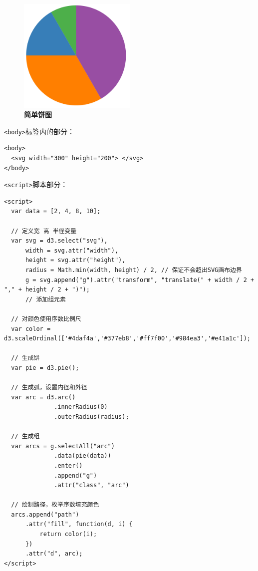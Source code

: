 \begin{figure}[htbp]
    \centering
    \includegraphics[width=0.5\textwidth]{figure/D3/simple_pie.png}
    \caption{\textbf{简单饼图}}
    \label{fig:simple_pie}
\end{figure}

\verb|<body>|标签内的部分：

\begin{verbatim}
<body>
  <svg width="300" height="200"> </svg>
</body>
\end{verbatim}

\verb|<script>|脚本部分：

\begin{verbatim}
<script>
  var data = [2, 4, 8, 10];

  // 定义宽 高 半径变量
  var svg = d3.select("svg"),
      width = svg.attr("width"),
      height = svg.attr("height"),
      radius = Math.min(width, height) / 2, // 保证不会超出SVG画布边界
      g = svg.append("g").attr("transform", "translate(" + width / 2 + "," + height / 2 + ")");
      // 添加组元素
  
  // 对颜色使用序数比例尺
  var color = d3.scaleOrdinal(['#4daf4a','#377eb8','#ff7f00','#984ea3','#e41a1c']);

  // 生成饼
  var pie = d3.pie();

  // 生成弧，设置内径和外径
  var arc = d3.arc()
              .innerRadius(0)
              .outerRadius(radius);

  // 生成组
  var arcs = g.selectAll("arc")
              .data(pie(data))
              .enter()
              .append("g")
              .attr("class", "arc")

  // 绘制路径，枚举序数填充颜色
  arcs.append("path")
      .attr("fill", function(d, i) {
          return color(i);
      })
      .attr("d", arc);
</script>
\end{verbatim}

